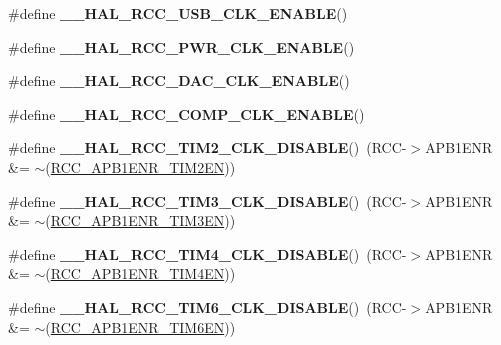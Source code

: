 \begin{DoxyCompactItemize}
\#define {\bfseries \-\_\-\-\_\-\-H\-A\-L\-\_\-\-R\-C\-C\-\_\-\-U\-S\-B\-\_\-\-C\-L\-K\-\_\-\-E\-N\-A\-B\-L\-E}()
\item 
\#define {\bfseries \-\_\-\-\_\-\-H\-A\-L\-\_\-\-R\-C\-C\-\_\-\-P\-W\-R\-\_\-\-C\-L\-K\-\_\-\-E\-N\-A\-B\-L\-E}()
\item 
\#define {\bfseries \-\_\-\-\_\-\-H\-A\-L\-\_\-\-R\-C\-C\-\_\-\-D\-A\-C\-\_\-\-C\-L\-K\-\_\-\-E\-N\-A\-B\-L\-E}()
\item 
\#define {\bfseries \-\_\-\-\_\-\-H\-A\-L\-\_\-\-R\-C\-C\-\_\-\-C\-O\-M\-P\-\_\-\-C\-L\-K\-\_\-\-E\-N\-A\-B\-L\-E}()
\item 
\hypertarget{group___r_c_c___a_p_b1___clock___enable___disable_gad2def81b1df0e62cd322ab60b31ba59f}{\#define {\bfseries \-\_\-\-\_\-\-H\-A\-L\-\_\-\-R\-C\-C\-\_\-\-T\-I\-M2\-\_\-\-C\-L\-K\-\_\-\-D\-I\-S\-A\-B\-L\-E}()~(R\-C\-C-\/$>$A\-P\-B1\-E\-N\-R \&= $\sim$(\hyperlink{group___peripheral___registers___bits___definition_gacd3966a4d6ae47f06b3c095eaf26a610}{R\-C\-C\-\_\-\-A\-P\-B1\-E\-N\-R\-\_\-\-T\-I\-M2\-E\-N}))}\label{group___r_c_c___a_p_b1___clock___enable___disable_gad2def81b1df0e62cd322ab60b31ba59f}

\item 
\hypertarget{group___r_c_c___a_p_b1___clock___enable___disable_ga9fb7035f007ec272b725e51018a36b23}{\#define {\bfseries \-\_\-\-\_\-\-H\-A\-L\-\_\-\-R\-C\-C\-\_\-\-T\-I\-M3\-\_\-\-C\-L\-K\-\_\-\-D\-I\-S\-A\-B\-L\-E}()~(R\-C\-C-\/$>$A\-P\-B1\-E\-N\-R \&= $\sim$(\hyperlink{group___peripheral___registers___bits___definition_ga75bfa33eb00ee30c6e22f7ceea464ac7}{R\-C\-C\-\_\-\-A\-P\-B1\-E\-N\-R\-\_\-\-T\-I\-M3\-E\-N}))}\label{group___r_c_c___a_p_b1___clock___enable___disable_ga9fb7035f007ec272b725e51018a36b23}

\item 
\hypertarget{group___r_c_c___a_p_b1___clock___enable___disable_ga8888dfd8a1e50f8019f581506ec776d8}{\#define {\bfseries \-\_\-\-\_\-\-H\-A\-L\-\_\-\-R\-C\-C\-\_\-\-T\-I\-M4\-\_\-\-C\-L\-K\-\_\-\-D\-I\-S\-A\-B\-L\-E}()~(R\-C\-C-\/$>$A\-P\-B1\-E\-N\-R \&= $\sim$(\hyperlink{group___peripheral___registers___bits___definition_gad4fbbf6b1beeec92c7d80e9e05bd1461}{R\-C\-C\-\_\-\-A\-P\-B1\-E\-N\-R\-\_\-\-T\-I\-M4\-E\-N}))}\label{group___r_c_c___a_p_b1___clock___enable___disable_ga8888dfd8a1e50f8019f581506ec776d8}

\item 
\hypertarget{group___r_c_c___a_p_b1___clock___enable___disable_ga1ee14a6e314a50eee7a1a09482a25abf}{\#define {\bfseries \-\_\-\-\_\-\-H\-A\-L\-\_\-\-R\-C\-C\-\_\-\-T\-I\-M6\-\_\-\-C\-L\-K\-\_\-\-D\-I\-S\-A\-B\-L\-E}()~(R\-C\-C-\/$>$A\-P\-B1\-E\-N\-R \&= $\sim$(\hyperlink{group___peripheral___registers___bits___definition_gafb0279b1f0ff35c2df728d9653cabc0c}{R\-C\-C\-\_\-\-A\-P\-B1\-E\-N\-R\-\_\-\-T\-I\-M6\-E\-N}))}\label{group___r_c_c___a_p_b1___clock___enable___disable_ga1ee14a6e314a50eee7a1a09482a25abf}


\end{DoxyCompactItemize}
